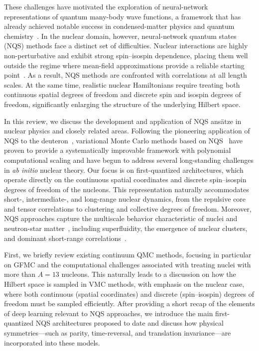 These challenges have motivated the exploration of neural-network representations of quantum many-body wave functions, a framework that has already achieved notable success in condensed-matter physics and quantum chemistry~\cite{carleo_solving_2017,hermann_deep-neural-network_2020,pfau_ab_2020}. In the nuclear domain, however, neural-network quantum states (NQS) methods face a distinct set of difficulties. Nuclear interactions are highly non-perturbative and exhibit strong spin--isospin dependence, placing them well outside the regime where mean-field approximations provide a reliable starting point~\cite{wiringa_accurate_1995}. As a result, NQS methods are confronted with correlations at all length scales. At the same time, realistic nuclear Hamiltonians require treating both continuous spatial degrees of freedom and discrete spin and isospin degrees of freedom, significantly enlarging the structure of the underlying Hilbert space.

In this review, we discuss the development and application of NQS ans\"atze in nuclear physics and closely related areas. Following the pioneering application of NQS to the deuteron~\cite{keeble_machine_2020}, variational Monte Carlo methods based on NQS~\cite{adams_variational_2021,yang_consistent_2022,lovato_hidden-nucleons_2022,Yang:2023rlw,gnech_distilling_2024} have proven to provide a systematically improvable framework with polynomial computational scaling and have begun to address several long-standing challenges in \emph{ab initio} nuclear theory. Our focus is on first-quantized architectures, which operate directly on the continuous spatial coordinates and discrete spin--isospin degrees of freedom of the nucleons. This representation naturally accommodates short-, intermediate-, and long-range nuclear dynamics, from the repulsive core and tensor correlations to clustering and collective degrees of freedom. Moreover, NQS approaches capture the multiscale behavior characteristic of nuclei and neutron-star matter~\cite{fore2023}, including superfluidity, the emergence of nuclear clusters, and dominant short-range correlations~\cite{kim_neural-network_2024,fore_investigating_2024}.

First, we briefly review existing continuum QMC methods, focusing in particular on GFMC and the computational challenges associated with treating nuclei with more than $A=13$ nucleons. This naturally leads to a discussion on how the Hilbert space is sampled in VMC methods, with emphasis on the nuclear case, where both continuous (spatial coordinates) and discrete (spin--isospin) degrees of freedom must be sampled efficiently. After providing a short recap of the elements of deep learning relevant to NQS approaches, we introduce the main first-quantized NQS architectures proposed to date and discuss how physical symmetries—such as parity, time-reversal, and translation invariance—are incorporated into these models.

